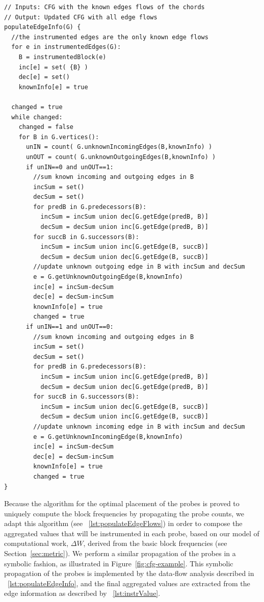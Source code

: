 \begin{lstlisting}[caption={Pseudocode of the data-flow analysis for assigning the values computed
  in each probe of the instrumentation for the profiling of the work metric.}, label={lst:populateEdgeInfo}, float]
// Inputs: CFG with the known edges flows of the chords
// Output: Updated CFG with all edge flows
populateEdgeInfo(G) {
  //the instrumented edges are the only known edge flows
  for e in instrumentedEdges(G):
    B = instrumentedBlock(e)
    inc[e] = set( {B} )
    dec[e] = set()
    knownInfo[e] = true

  changed = true
  while changed:
    changed = false
    for B in G.vertices():
      unIN = count( G.unknownIncomingEdges(B,knownInfo) )
      unOUT = count( G.unknownOutgoingEdges(B,knownInfo) )
      if unIN==0 and unOUT==1:
        //sum known incoming and outgoing edges in B
        incSum = set()
        decSum = set()
        for predB in G.predecessors(B):
          incSum = incSum union dec[G.getEdge(predB, B)]
          decSum = decSum union inc[G.getEdge(predB, B)]
        for succB in G.successors(B):
          incSum = incSum union inc[G.getEdge(B, succB)]
          decSum = decSum union dec[G.getEdge(B, succB)]
        //update unknown outgoing edge in B with incSum and decSum
        e = G.getUnknownOutgoingEdge(B,knownInfo)
        inc[e] = incSum-decSum
        dec[e] = decSum-incSum
        knownInfo[e] = true
        changed = true
      if unIN==1 and unOUT==0:
        //sum known incoming and outgoing edges in B
        incSum = set()
        decSum = set()
        for predB in G.predecessors(B):
          incSum = incSum union inc[G.getEdge(predB, B)]
          decSum = decSum union dec[G.getEdge(predB, B)]
        for succB in G.successors(B):
          incSum = incSum union dec[G.getEdge(B, succB)]
          decSum = decSum union inc[G.getEdge(B, succB)]
        //update unknown incoming edge in B with incSum and decSum
        e = G.getUnknownIncomingEdge(B,knownInfo)
        inc[e] = incSum-decSum
        dec[e] = decSum-incSum
        knownInfo[e] = true
        changed = true
}\end{lstlisting}

Because the algorithm for the optimal placement of the probes is proved to uniquely compute the block frequencies by propagating the probe counts, we adapt this algorithm (see \lstlistingname~\ref{lst:populateEdgeFlows}) in order to compose the aggregated values that will be instrumented in each probe, based on our model of computational work, $\Delta W$, derived from the basic block frequencies (see Section~\ref{sec:metric}).
We perform a similar propagation of the probes in a symbolic fashion, as illustrated in Figure~\ref{fig:cfg-example}.
This symbolic propagation of the probes is implemented by the data-flow analysis described in \lstlistingname~\ref{lst:populateEdgeInfo}, and the final aggregated values are extracted from the edge information as described by \lstlistingname~\ref{lst:instrValue}.

